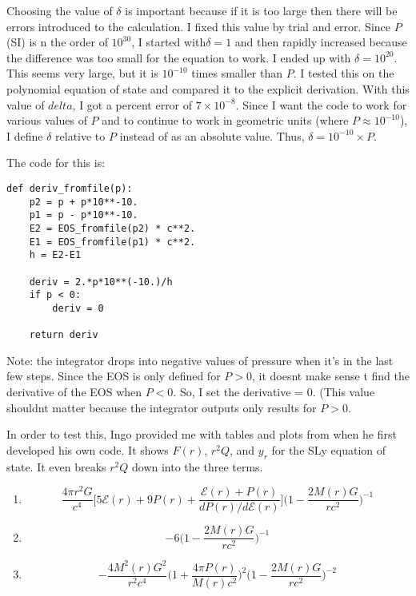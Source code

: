 \documentclass[11pt]{article}
\numberwithin{equation}{section}
\begin{document}
Choosing the value of $\delta$ is important because if it is too large then there will be errors introduced to the calculation.  I fixed this value by trial and error.  Since $P$ (SI) is n the order of $10^{30}$,  I started with$\delta = 1$ and then rapidly increased because the difference was too small for the equation to work.  I ended up with $\delta = 10^{20}$.  This seems very large, but it is $10^{-10}$ times smaller than $P$.  I  tested this on the polynomial equation of state and compared it to the explicit derivation.  With this value of $delta$, I got a percent error of $7 \times 10^{-8}$.   Since I want the code to work for various values of $P$ and to continue to work in geometric units (where $P \approx  10^{-10}$), I define $\delta$ relative to $P$ instead of as an absolute value.  Thus, $\delta = 10^{-10} \times P$.

The code for this is:

\begin{lstlisting}
def deriv_fromfile(p):
    p2 = p + p*10**-10. 
    p1 = p - p*10**-10. 
    E2 = EOS_fromfile(p2) * c**2.
    E1 = EOS_fromfile(p1) * c**2. 
    h = E2-E1

    deriv = 2.*p*10**(-10.)/h
    if p < 0:
        deriv = 0
        
    return deriv
\end{lstlisting}

Note: the integrator drops into negative values of pressure when it's in the last few steps.  Since the EOS is only defined for $P>0$, it doesnt make sense t find the derivative of the EOS when $P<0$.  So, I set the derivative = 0.  (This value shouldnt matter because the integrator outputs only results for $P>0$.

In order to test this, Ingo provided me with tables and plots from when he first developed his own code.  It shows $F(r)$, $r^{2} Q$, and $y_r$ for the SLy equation of state.  It even breaks $r^2Q$ down into the three terms.  

\begin{enumerate}
\item
\begin{equation}
\frac{4 \pi r^{2} G}{c^{4}} \bigg[ 5 \mathcal{E}(r) + 9 P(r) + \frac{\mathcal{E}(r) + P(r)}{dP(r)/d\mathcal{E}(r)}   \bigg] \bigg(  1 - \frac{2 M(r) G}{r c^{2}} \bigg) ^{-1} 
\end{equation}
\item
\begin{equation}
- 6 \bigg( 1- \frac{2 M(r) G}{r c^{2}}  \bigg)^{-1}
\end{equation}
\item
\begin{equation}
- \frac{4 M^{2}(r) G^{2}}{r^{2}c^{4}} \bigg( 1 + \frac{4 \pi P(r)}{M(r) c^{2}}  \bigg)^{2} \bigg( 1 - \frac{2 M(r) G}{r c^{2}} \bigg)^{-2}
\end{equation}
\end{enumerate}
\end{document}
